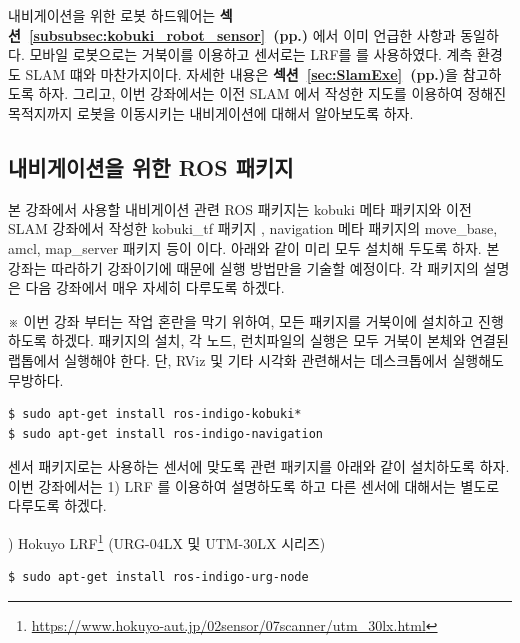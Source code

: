 내비게이션을 위한 로봇 하드웨어는 \textbf{섹션~\ref{subsubsec:kobuki_robot_sensor}~(pp.\pageref{subsubsec:kobuki_robot_sensor})} 에서 이미 언급한 사항과 동일하다. 모바일 로봇으로는 거북이를 이용하고 센서로는 LRF를 를 사용하였다. 계측 환경도 SLAM 떄와 마찬가지이다. 자세한 내용은 \textbf{섹션~\ref{sec:SlamExe}~(pp.\pageref{sec:SlamExe})}을 참고하도록 하자. 그리고, 이번 강좌에서는 이전 SLAM 에서 작성한 지도를 이용하여 정해진 목적지까지 로봇을 이동시키는 내비게이션에 대해서 알아보도록 하자.

\subsection{내비게이션을 위한 ROS 패키지}

본 강좌에서 사용할 내비게이션 관련 ROS 패키지는 kobuki 메타 패키지와 이전 SLAM 강좌에서 작성한 kobuki\_tf 패키지 , navigation 메타 패키지의 move\_base, amcl, map\_server 패키지 등이 이다. 아래와 같이 미리 모두 설치해 두도록 하자. 본 강좌는 따라하기 강좌이기에 때문에 실행 방법만을 기술할 예정이다. 각 패키지의 설명은 다음 강좌에서 매우 자세히 다루도록 하겠다. 

※ 이번 강좌 부터는 작업 혼란을 막기 위하여, 모든 패키지를 거북이에 설치하고 진행하도록 하겠다. 패키지의 설치, 각 노드, 런치파일의 실행은 모두 거북이 본체와 연결된 랩톱에서 실행해야 한다. 단, RViz 및 기타 시각화 관련해서는 데스크톱에서 실행해도 무방하다.

\vspace{\baselineskip}
\begin{lstlisting}[language=ROS]
$ sudo apt-get install ros-indigo-kobuki*
$ sudo apt-get install ros-indigo-navigation
\end{lstlisting}

센서 패키지로는 사용하는 센서에 맞도록 관련 패키지를 아래와 같이 설치하도록 하자. 이번 강좌에서는 1) LRF 를 이용하여 설명하도록 하고 다른 센서에 대해서는 별도로 다루도록 하겠다.

\setcounter{num}{0}

\vspace{\baselineskip}
\noindent
{}
\thenum) Hokuyo LRF\footnote{\url{https://www.hokuyo-aut.jp/02sensor/07scanner/utm_30lx.html}} (URG-04LX 및 UTM-30LX 시리즈)

\vspace{\baselineskip}
\begin{lstlisting}[language=ROS]
$ sudo apt-get install ros-indigo-urg-node
\end{lstlisting}
 
